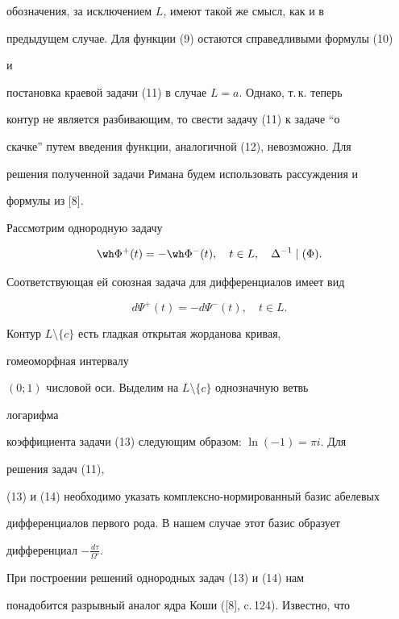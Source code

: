 обозначения, за исключением $L$, имеют такой же смысл, как и в 


предыдущем случае. Для функции (9) остаются справедливыми формулы (10) 


и 


постановка краевой задачи (11) в случае $L=a$. Однако, т.\,к. теперь 


контур не является разбивающим, то свести задачу (11) к задаче ``о 


скачке'' путем введения функции, аналогичной (12), невозможно. Для 


решения полученной задачи Римана будем использовать рассуждения и 


формулы из [8]. 


 


Рассмотрим однородную задачу 


\begin{equation} 


\wh\Phi^+(t)=-\wh\Phi^-(t),\quad t\in L,\quad 


\Delta^{-1}\mid(\Phi). 


\end{equation} 


Соответствующая ей союзная задача для дифференциалов имеет вид 


\begin{equation} 


d\Psi^+(t)=-d\Psi^-(t),\quad t\in L. 


\end{equation} 


Контур $L\setminus\{c\}$ есть гладкая открытая жорданова кривая, 


гомеоморфная интервалу 


$(0;1)$ числовой оси. Выделим на $L\setminus\{c\}$ однозначную ветвь 


логарифма 


коэффициента задачи (13) следующим образом: $\ln(-1)=\pi i$. Для 


решения задач (11), 


(13) и (14) необходимо указать комплексно-нормированный базис абелевых 


дифференциалов первого рода. В нашем случае этот базис образует 


дифференциал $-\frac{d\tau}{\Omega'}$. 


При построении решений однородных задач (13) и (14) нам 


понадобится разрывный аналог ядра Коши ([8], c.\,124). Известно, что 


